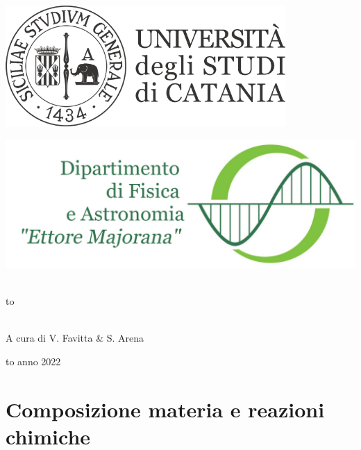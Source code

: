 \documentclass[openany,12pt]{book}%
\newcommand\blankpage{%
    \null
    \thispagestyle{empty}%
    \newpage}
\newcommand{\comment}[1]{}
\begin{document}
\thispagestyle{empty}
\begin{center}

\begin{minipage}[c]{0.45\textwidth}
\begin{flushleft}
\includegraphics[width=0.8\textwidth]{logo-unict-orizzontale-grigio.png}
\end{flushleft}
\end{minipage}
\hfill
\begin{minipage}[c]{0.45\textwidth}
\begin{flushright}
\includegraphics[width=\textwidth]{logo_dfa_orizzontale}
\end{flushright}
\end{minipage}\\
\medskip
\hbox to \textwidth{\hrulefill}

\vfill
\vfill

\vfill
\uppercase{}\\

\vfill
\large{A cura di V. Favitta \& S. Arena }

\vfill
\vfill
\hbox to \textwidth{\hrulefill}
{\sc anno 2022}
\end{center}

\afterpage{\blankpage}

\tableofcontents
\chapter{Composizione materia e reazioni chimiche}
\end{document}
